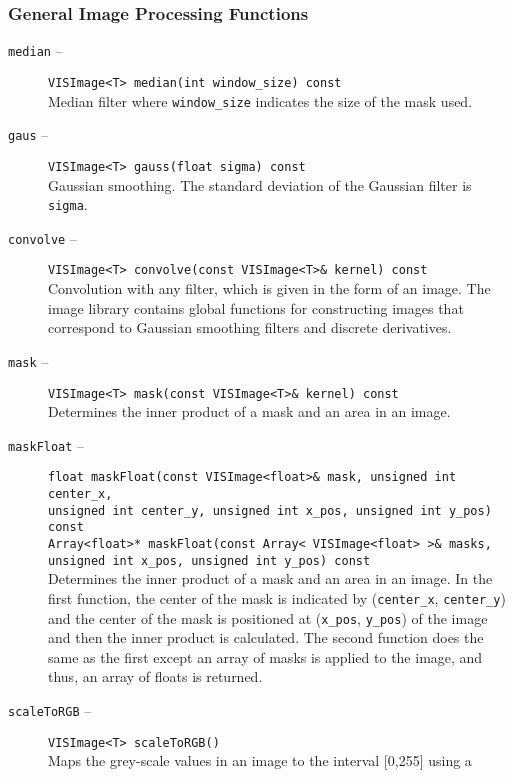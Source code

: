 \subsubsection{General Image Processing Functions}
\label{il_gipf}
\begin{description}
\item[{\tt median} --]
{\tt VISImage<T> median(int window\_size) const}\\
Median filter where {\tt window\_size} indicates the size
of the mask used.
\item[{\tt gaus} --]
{\tt VISImage<T> gauss(float sigma) const}\\
Gaussian smoothing.  The standard deviation of the Gaussian filter
is {\tt sigma}.
\item[{\tt convolve} --]
{\tt VISImage<T> convolve(const VISImage<T>\& kernel) const}\\
Convolution with any filter, which is given in the form of an image.  
The image library contains global functions for constructing images 
that correspond to Gaussian smoothing filters and discrete derivatives.
\item[{\tt mask} --]
{\tt VISImage<T> mask(const VISImage<T>\& kernel) const}\\
Determines the inner product of a mask and an area in an image.
\item[{\tt maskFloat} --]
{\tt float maskFloat(const VISImage<float>\& mask, unsigned int center\_x,} \\
\hspace*{0.25in}
{\tt unsigned int center\_y, unsigned int x\_pos, unsigned int y\_pos) const}\\
{\tt Array<float>* maskFloat(const Array< VISImage<float> >\& masks,}\\
\hspace*{0.25in}
{\tt unsigned int x\_pos, unsigned int y\_pos) const}\\
Determines the inner product of a mask and an area in an image.
In the first function, the center of the mask is indicated by
({\tt center\_x}, {\tt center\_y}) and the center of the mask is
positioned at ({\tt x\_pos}, {\tt y\_pos}) of the image and then the
inner product is calculated.  The second function does
the same as the first except an array of masks is applied
to the image, and thus, an array of floats is returned.
\item[{\tt scaleToRGB} --]
{\tt VISImage<T> scaleToRGB()}\\
Maps the grey-scale values in an image to the interval [0,255] using a 

\end{description}
